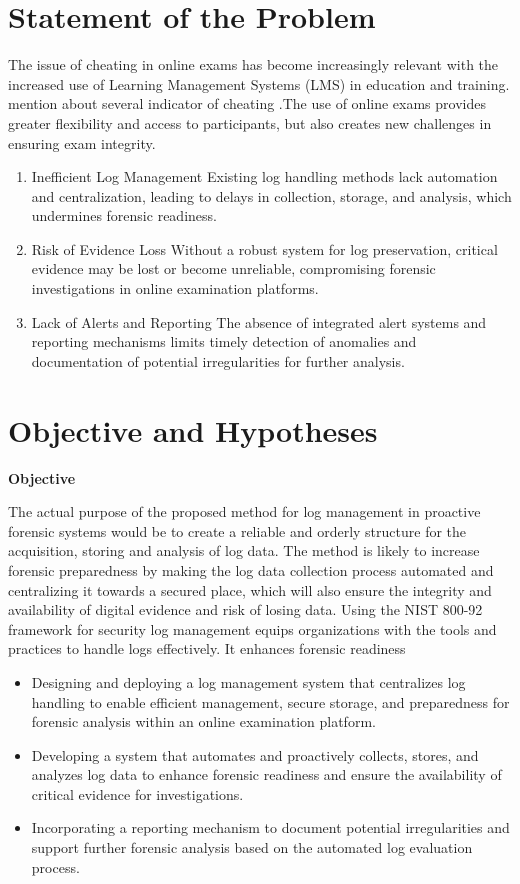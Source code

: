 \section{Statement of the Problem}
The issue of cheating in online exams has become increasingly relevant with the increased use of Learning Management Systems (LMS) in education and training. \citet{ranger2020detection} mention about several indicator of cheating .The use of online exams provides greater flexibility and access to participants, but also creates new challenges in ensuring exam integrity.
 
\begin{enumerate}
    \item Inefficient Log Management Existing log handling methods lack automation and centralization, leading to delays in collection, storage, and analysis, which undermines forensic readiness.
    \item Risk of Evidence Loss Without a robust system for log preservation, critical evidence may be lost or become unreliable, compromising forensic investigations in online examination platforms.
    \item Lack of Alerts and Reporting The absence of integrated alert systems and reporting mechanisms limits timely detection of anomalies and documentation of potential irregularities for further analysis.
\end{enumerate}


\section{Objective and Hypotheses}

\textbf{Objective} 

The actual purpose of the proposed method for log management in proactive forensic systems would be to create a reliable and orderly structure for the acquisition, storing and analysis of log data. The method is likely to increase forensic preparedness by making the log data collection process automated and centralizing it towards a secured place, which will also ensure the integrity and availability of digital evidence and risk of losing data. Using the NIST 800-92 framework for security log management equips organizations with the tools and practices to handle logs effectively. It enhances forensic readiness
\begin{itemize}
    \item Designing and deploying a log management system that centralizes log handling to enable efficient management, secure storage, and preparedness for forensic analysis within an online examination platform.
    \item Developing a system that automates and proactively collects, stores, and analyzes log data to enhance forensic readiness and ensure the availability of critical evidence for investigations.
    \item Incorporating a reporting mechanism to document potential irregularities and 
    support further forensic analysis based on the automated log evaluation process.
\end{itemize}


